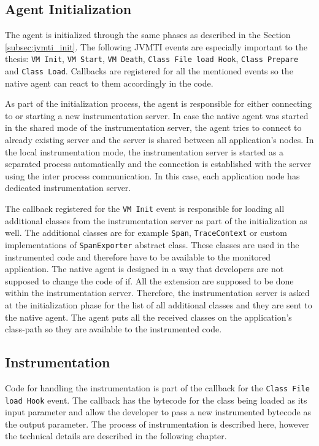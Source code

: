 \subsection{Agent Initialization}
The agent is initialized through the same phases as described in the Section \ref{subsec:jvmti_init}. The following JVMTI events are especially important to the thesis: \texttt{VM Init}, \texttt{VM Start}, \texttt{VM Death}, \texttt{Class File load Hook}, \texttt{Class Prepare} and \texttt{Class Load}. Callbacks are registered for all the mentioned events so the native agent can react to them accordingly in the code.

As part of the initialization process, the agent is responsible for either connecting to or starting a new instrumentation server. In case the native agent was started in the shared mode of the instrumentation server, the agent tries to connect to already existing server and the server is shared between all application's nodes. In the local instrumentation mode, the instrumentation server is started as a separated process automatically and the connection is established with the server using the inter process communication. In this case, each application node has dedicated instrumentation server.

The callback registered for the \texttt{VM Init} event is responsible for loading all additional classes from the instrumentation server as part of the initialization as well. The additional classes are for example \texttt{Span}, \texttt{TraceContext} or custom implementations of \texttt{SpanExporter} abstract class. These classes are used in the instrumented code and therefore have to be available to the monitored application. The native agent is designed in a way that developers are not supposed to change the code of if. All the extension are supposed to be done within the instrumentation server. Therefore, the instrumentation server is asked at the initialization phase for the list of all additional classes and they are sent to the native agent. The agent puts all the received classes on the application's class-path so they are available to the instrumented code.

\subsection{Instrumentation}
Code for handling the instrumentation is part of the callback for the \texttt{Class File load Hook} event. The callback has the bytecode for the class being loaded as its input parameter and allow the developer to pass a new instrumented bytecode as the output parameter. The process of instrumentation is described here, however the technical details are described in the following chapter.


